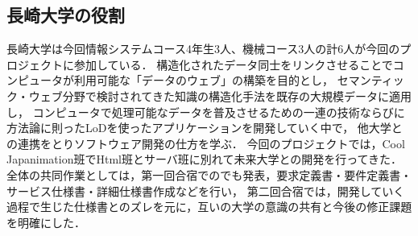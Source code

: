 \subsection{長崎大学の役割}
\par
長崎大学は今回情報システムコース4年生3人、機械コース3人の計6人が今回のプロジェクトに参加している．
構造化されたデータ同士をリンクさせることでコンピュータが利用可能な「データのウェブ」の構築を目的とし，
セマンティック・ウェブ分野で検討されてきた知識の構造化手法を既存の大規模データに適用し，
コンピュータで処理可能なデータを普及させるための一連の技術ならびに方法論に則ったLoDを使ったアプリケーションを開発していく中で，
他大学との連携をとりソフトウェア開発の仕方を学ぶ．
今回のプロジェクトでは，Cool Japanimation班でHtml班とサーバ班に別れて未来大学との開発を行ってきた．
全体の共同作業としては，第一回合宿でのでも発表，要求定義書・要件定義書・サービス仕様書・詳細仕様書作成などを行い，
第二回合宿では，開発していく過程で生じた仕様書とのズレを元に，互いの大学の意識の共有と今後の修正課題を明確にした．

